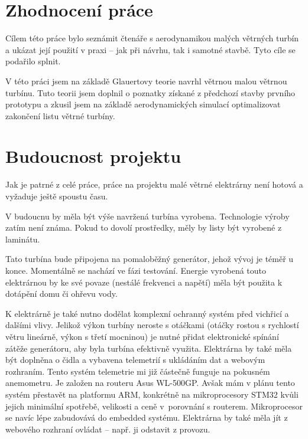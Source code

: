 \chapter{Zhodnocení práce}
Cílem této práce bylo seznámit čtenáře s aerodynamikou malých větrných turbín a ukázat její použití v praxi – jak při návrhu, tak i samotné stavbě. Tyto cíle se podařilo splnit.

V této práci jsem na základě Glauertovy teorie navrhl větrnou malou větrnou turbínu. Tuto teorii jsem doplnil o poznatky získané z předchozí stavby prvního prototypu a zkusil jsem na základě aerodynamických simulací optimalizovat zakončení listu větrné turbíny.

\chapter{Budoucnost projektu}

Jak je patrné z celé práce, práce na projektu malé větrné elektrárny není hotová a vyžaduje ještě spoustu času.

V budoucnu by měla být výše navržená turbína vyrobena. Technologie výroby zatím není známa. Pokud to dovolí prostředky, měly by listy být vyrobené z laminátu.

Tato turbína bude připojena na pomaloběžný generátor, jehož vývoj je téměř u konce. Momentálně se nachází ve fázi testování. Energie vyrobená touto elektrárnou by ke své povaze (nestálé frekvenci a napětí) měla být použita k dotápění domu či ohřevu vody.

K elektrárně je také nutno dodělat komplexní ochranný systém před vichřicí a dalšími vlivy. Jelikož výkon turbíny neroste s otáčkami (otáčky rostou s rychlostí větru lineárně, výkon s třetí mocninou) je nutné přidat elektronické spínání zátěže generátoru, aby byla turbína efektivně využita. Elektrárna by také měla být doplněna o čidla a vybavena telemetrií s ukládáním dat a webovým rozhraním. Tento systém telemetrie mi již částečně funguje na pokusném anemometru. Je založen na routeru Asus WL-500GP. Avšak mám v plánu tento systém přestavět na platformu ARM, konkrétně na mikroprocesory STM32 kvůli jejich minimální spotřebě, velikosti a ceně v~porovnání s routerem. Mikroprocesor se navíc lépe zabudovává do embedded systému. Elektrárna by také měla jít z webového rozhraní ovládat – např. ji odstavit z provozu.

